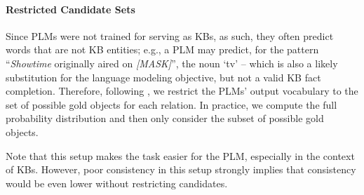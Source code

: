 \paragraph{Restricted Candidate Sets}

Since PLMs were not trained for
serving as KBs, as such, they often predict words
that are not KB entities;
e.g., a PLM may predict, for the pattern ``\textit{Showtime} originally aired on \textit{[MASK]}'', the noun
`tv' --  which is also a likely substitution for the language
modeling objective, but not a valid KB fact completion.
Therefore,
following \citep{Xiong2020Pretrained, kassner2021multilingual},
we
restrict the PLMs' output vocabulary to the set of possible gold objects for each
relation. In practice, we compute the full probability
distribution and then only consider the subset of possible
gold objects.

Note that this setup makes the task easier for the PLM,
especially in the context of KBs. However, poor
consistency in this setup strongly implies that consistency
would be even lower without restricting candidates.

